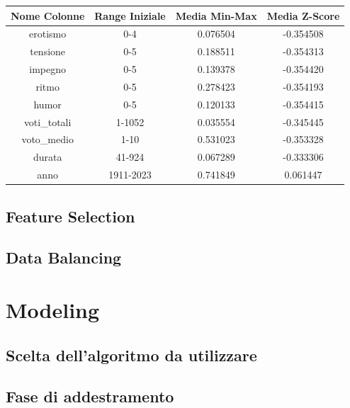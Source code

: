 \documentclass[a4paper, 12pt]{report}
\begin{document}
            \begin{tabular}{ |c|c|c|c| }
                \hline \rowcolor{Goldenrod} Nome Colonne & Range Iniziale & Media Min-Max & Media Z-Score \\
                \hline erotismo & 0-4 & 0.076504 &  -0.354508 \\
                \hline tensione & 0-5 & 0.188511 & -0.354313 \\
                \hline impegno & 0-5 & 0.139378 & -0.354420 \\
                \hline ritmo & 0-5 & 0.278423 & -0.354193 \\
                \hline humor & 0-5 & 0.120133 & -0.354415 \\
                \hline voti\_totali & 1-1052 & 0.035554 & -0.345445 \\
                \hline voto\_medio & 1-10 & 0.531023 & -0.353328 \\
                \hline durata & 41-924 & 0.067289 & -0.333306 \\
                \hline anno & 1911-2023 & 0.741849 & 0.061447 \\
                \hline
            \end{tabular}

        \section{Feature Selection}\label{sec:feature-selection}


        \section{Data Balancing}\label{sec:data-balancing}


    \chapter{Modeling}\label{ch:modeling}


        \section{Scelta dell'algoritmo da utilizzare}\label{sec:scelta-dell'algoritmo-da-utilizzare}


        \section{Fase di addestramento}\label{sec:fase-di-addestramento}
\end{document}
